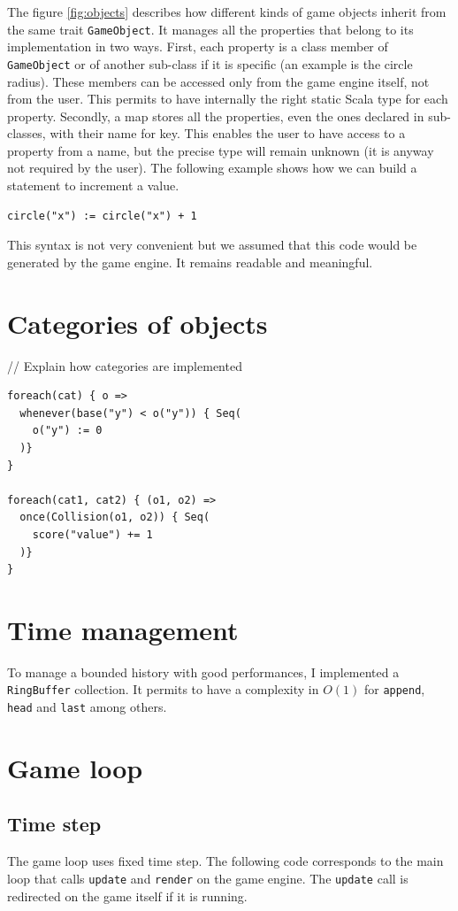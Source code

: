 \documentclass[11pt,a4paper]{article}
\begin{document}
The figure \ref{fig:objects} describes how different kinds of game objects inherit from the same trait \texttt{GameObject}. It manages all the properties that belong to its implementation in two ways. First, each property is a class member of \texttt{GameObject} or of another sub-class if it is specific (an example is the circle radius). These members can be accessed only from the game engine itself, not from the user. This permits to have internally the right static Scala type for each property. Secondly, a map stores all the properties, even the ones declared in sub-classes, with their name for key. This enables the user to have access to a property from a name, but the precise type will remain unknown (it is anyway not required by the user). The following example shows how we can build a statement to increment a value.

\begin{lstlisting}
circle("x") := circle("x") + 1
\end{lstlisting}

This syntax is not very convenient but we assumed that this code would be generated by the game engine. It remains readable and meaningful.


\section{Categories of objects}

// Explain how categories are implemented

\begin{lstlisting}
foreach(cat) { o =>
  whenever(base("y") < o("y")) { Seq(
    o("y") := 0
  )}
}

foreach(cat1, cat2) { (o1, o2) =>
  once(Collision(o1, o2)) { Seq(
    score("value") += 1
  )}  
}
\end{lstlisting}


\section{Time management}
To manage a bounded history with good performances, I implemented a \texttt{RingBuffer} collection. It permits to have a complexity in $O(1)$ for \texttt{append}, \texttt{head} and \texttt{last} among others.


\section{Game loop}

\subsection{Time step}
The game loop uses fixed time step. The following code corresponds to the main loop that calls \texttt{update} and \texttt{render} on the game engine. The \texttt{update} call is redirected on the game itself if it is running.
\end{document}
